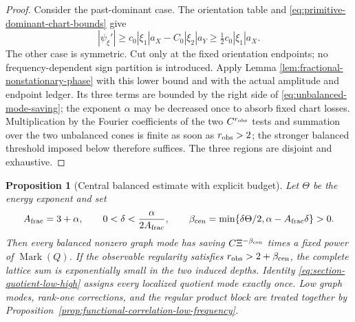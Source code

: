 \documentclass[11pt]{article}
\newtheorem{proposition}[theorem]{Proposition}
\begin{document}
\begin{proof}
Consider the past-dominant case.  The orientation table and
\eqref{eq:primitive-dominant-chart-bounds} give
\[
 |\psi_\xi'|
 \ge c_0|\xi_1|a_X-C_0|\xi_2|a_Y
 \ge \tfrac12c_0|\xi_1|a_X.
\]
The other case is symmetric.  Cut only at the fixed orientation endpoints;
no frequency-dependent sign partition is introduced.  Apply Lemma
\ref{lem:fractional-nonstationary-phase} with this lower bound and with the
actual amplitude and endpoint ledger.  Its three terms are bounded by the
right side of \eqref{eq:unbalanced-mode-saving}; the exponent $\alpha$ may be
decreased once to absorb fixed chart losses.  Multiplication by the Fourier
coefficients of the two $C^{r_{\rm obs}}$ tests and summation over the two
unbalanced cones is finite as soon as $r_{\rm obs}>2$; the stronger balanced
threshold imposed below therefore suffices.  The three regions are disjoint
and exhaustive.
\end{proof}

\begin{proposition}[Central balanced estimate with explicit budget]
\label{prop:central-phase-verification}
Let \(\Theta\) be the energy exponent and set
\[
 A_{\rm frac}=3+\alpha,\qquad
 0<\delta<\frac{\alpha}{2A_{\rm frac}},\qquad
 \beta_{\rm cen}=
 \min\{\delta\Theta/2,\alpha-A_{\rm frac}\delta\}>0.
\]
Then every balanced nonzero graph mode has saving
\(C\Xi^{-\beta_{\rm cen}}\) times a fixed power of
\(\operatorname{Mark}(Q)\).  If the observable regularity satisfies
\(r_{\rm obs}>2+\beta_{\rm cen}\), the complete lattice sum is exponentially
small in the two induced depths.  Identity
\eqref{eq:section-quotient-low-high} assigns every localized quotient mode
exactly once.  Low graph modes, rank-one corrections, and
the regular product block are treated together by
Proposition~\ref{prop:functional-correlation-low-frequency}.
\end{proposition}
\end{document}
